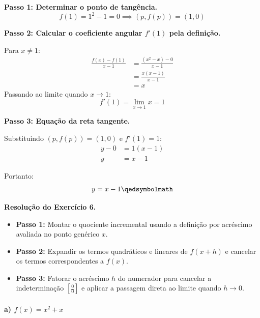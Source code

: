 \begin{enumerate}[label=\alph*)]
    \textbf{Passo 1: Determinar o ponto de tangência.}
    \[
    f(1) = 1^2 - 1 = 0 \implies (p, f(p)) = (1, 0)
    \]

    \textbf{Passo 2: Calcular o coeficiente angular $f'(1)$ pela definição.}

    Para $x \neq 1$:
    \begin{align*}
        \frac{f(x) - f(1)}{x - 1} &= \frac{(x^2 - x) - 0}{x - 1} \\[0.25cm]
        &= \frac{x(x - 1)}{x - 1} \\[0.25cm]
        &= x
    \end{align*}
    Passando ao limite quando $x \to 1$:
    \[
    f'(1) = \lim_{x \to 1} x = 1
    \]

    \textbf{Passo 3: Equação da reta tangente.}

    Substituindo $(p, f(p)) = (1, 0)$ e $f'(1) = 1$:
    \begin{align*}
        y - 0 &= 1(x - 1) \\[0.25cm]
        y &= x - 1
    \end{align*}

    Portanto:
    \[
    y = x - 1 \qedsymbolmath
    \]
\end{enumerate}

\vspace{0.6cm}
\noindent\textbf{Resolução do Exercício 6.}
\label{res:7.2.6}
\setcounter{equation}{0}

\begin{estrategiabox}[title=Estratégia Geral]
  \begin{itemize}[noitemsep, topsep=2pt]
    \item \textbf{Passo 1:} Montar o quociente incremental usando a definição por acréscimo avaliada no ponto genérico $x$.
    \item \textbf{Passo 2:} Expandir os termos quadráticos e lineares de $f(x + h)$ e cancelar os termos correspondentes a $f(x)$.
    \item \textbf{Passo 3:} Fatorar o acréscimo $h$ do numerador para cancelar a indeterminação $\left[\frac{0}{0}\right]$ e aplicar a passagem direta ao limite quando $h \to 0$.
  \end{itemize}
\end{estrategiabox}

\paragraph{a) $f(x) = x^2 + x$}

